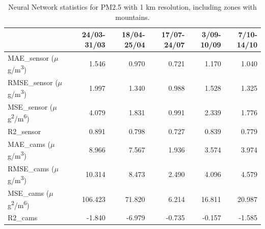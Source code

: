 \begin{table}[H]
\begin{tabular}{lrrrrr}
\toprule
 &  24/03-31/03 &  18/04-25/04 &  17/07-24/07 &  3/09-10/09 &  7/10-14/10 \\
\midrule
 MAE\_sensor ($\mu$g/m\textsuperscript{3})&        1.546 &        0.970 &        0.721 &       1.170 &       1.040 \\
RMSE\_sensor ($\mu$g/m\textsuperscript{3})&        1.997 &        1.340 &        0.988 &       1.528 &       1.325 \\
 MSE\_sensor ($\mu$g\textsuperscript{2}/m\textsuperscript{6})&        4.079 &        1.831 &        0.991 &       2.339 &       1.776 \\
  R2\_sensor &        0.891 &        0.798 &        0.727 &       0.839 &       0.779 \\
   MAE\_cams ($\mu$g/m\textsuperscript{3})&        8.966 &        7.567 &        1.936 &       3.574 &       3.974 \\
  RMSE\_cams ($\mu$g/m\textsuperscript{3})&       10.314 &        8.473 &        2.490 &       4.096 &       4.579 \\
   MSE\_cams ($\mu$g\textsuperscript{2}/m\textsuperscript{6})&      106.423 &       71.820 &        6.214 &      16.811 &      20.987 \\
    R2\_cams &       -1.840 &       -6.979 &       -0.735 &      -0.157 &      -1.585 \\
\bottomrule
\end{tabular}
\caption{Neural Network statistics for PM2.5 with 1 km resolution, including zones with mountains.}
\end{table}
